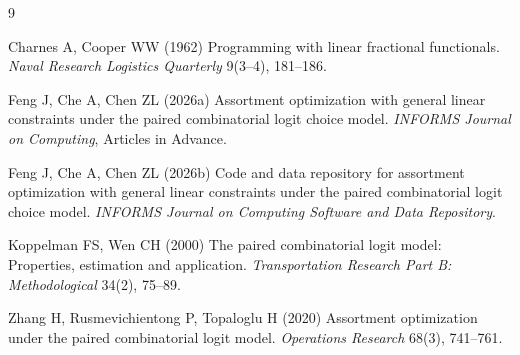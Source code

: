 \documentclass[10pt]{article}
\begin{document}
\begin{thebibliography}{9}\small

Charnes A, Cooper WW (1962)
Programming with linear fractional functionals.
\emph{Naval Research Logistics Quarterly} 9(3--4), 181--186.

Feng J, Che A, Chen ZL (2026a)
Assortment optimization with general linear constraints under the paired combinatorial logit choice model.
\emph{INFORMS Journal on Computing}, Articles in Advance.

Feng J, Che A, Chen ZL (2026b)
Code and data repository for assortment optimization with general linear constraints under the paired combinatorial logit choice model.
\emph{INFORMS Journal on Computing Software and Data Repository}.

Koppelman FS, Wen CH (2000)
The paired combinatorial logit model: Properties, estimation and application.
\emph{Transportation Research Part B: Methodological} 34(2), 75--89.

Zhang H, Rusmevichientong P, Topaloglu H (2020)
Assortment optimization under the paired combinatorial logit model.
\emph{Operations Research} 68(3), 741--761.

\end{thebibliography}
\end{document}
